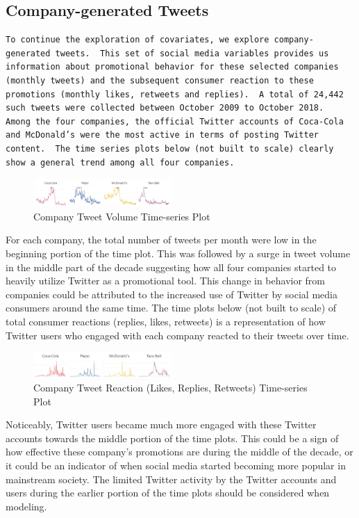 \documentclass[12pt,oneside]{chicagocapstone}
\begin{document}
\hypertarget{company-generated-tweets}{%
\subsection*{Company-generated Tweets}\label{company-generated-tweets}}
\begin{verbatim}
To continue the exploration of covariates, we explore company-generated tweets.  This set of social media variables provides us information about promotional behavior for these selected companies (monthly tweets) and the subsequent consumer reaction to these promotions (monthly likes, retweets and replies).  A total of 24,442 such tweets were collected between October 2009 to October 2018.  Among the four companies, the official Twitter accounts of Coca-Cola and McDonald’s were the most active in terms of posting Twitter content.  The time series plots below (not built to scale) clearly show a general trend among all four companies.  
\end{verbatim}
\begin{figure}

{\centering \includegraphics[width=200px,angle = 0, scale=2.1]{figure/CompanyTweets} 

}

\caption{Company Tweet Volume Time-series Plot}\label{fig:CompanyTweets}
\end{figure}
For each company, the total number of tweets per month were low in the beginning portion of the time plot. This was followed by a surge in tweet volume in the middle part of the decade suggesting how all four companies started to heavily utilize Twitter as a promotional tool. This change in behavior from companies could be attributed to the increased use of Twitter by social media consumers around the same time. The time plots below (not built to scale) of total consumer reactions (replies, likes, retweets) is a representation of how Twitter users who engaged with each company reacted to their tweets over time.
\begin{figure}

{\centering \includegraphics[width=200px,angle = 0, scale=2.1]{figure/ConsumerReactionTweets} 

}

\caption{Company Tweet Reaction (Likes, Replies, Retweets) Time-series Plot}\label{fig:ConsumerReactionTweets}
\end{figure}
Noticeably, Twitter users became much more engaged with these Twitter accounts towards the middle portion of the time plots. This could be a sign of how effective these company's promotions are during the middle of the decade, or it could be an indicator of when social media started becoming more popular in mainstream society. The limited Twitter activity by the Twitter accounts and users during the earlier portion of the time plots should be considered when modeling.
\end{document}
